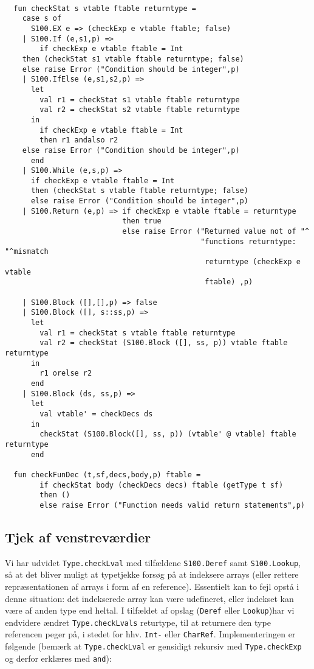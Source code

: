 \documentclass[10pt,a4paper,danish]{article}
\begin{document}
\begin{verbatim}

  fun checkStat s vtable ftable returntype =
    case s of
      S100.EX e => (checkExp e vtable ftable; false)
    | S100.If (e,s1,p) =>
        if checkExp e vtable ftable = Int
	then (checkStat s1 vtable ftable returntype; false)
	else raise Error ("Condition should be integer",p)
    | S100.IfElse (e,s1,s2,p) =>
      let
        val r1 = checkStat s1 vtable ftable returntype
        val r2 = checkStat s2 vtable ftable returntype
      in
        if checkExp e vtable ftable = Int
        then r1 andalso r2
	else raise Error ("Condition should be integer",p)
      end
    | S100.While (e,s,p) =>
      if checkExp e vtable ftable = Int
      then (checkStat s vtable ftable returntype; false)
      else raise Error ("Condition should be integer",p)
    | S100.Return (e,p) => if checkExp e vtable ftable = returntype
                           then true
                           else raise Error ("Returned value not of "^
                                             "functions returntype: "^mismatch
                                              returntype (checkExp e vtable 
                                              ftable) ,p)

    | S100.Block ([],[],p) => false
    | S100.Block ([], s::ss,p) =>
      let
        val r1 = checkStat s vtable ftable returntype
        val r2 = checkStat (S100.Block ([], ss, p)) vtable ftable returntype
      in
        r1 orelse r2
      end
    | S100.Block (ds, ss,p) =>
      let
        val vtable' = checkDecs ds
      in
        checkStat (S100.Block([], ss, p)) (vtable' @ vtable) ftable returntype
      end

  fun checkFunDec (t,sf,decs,body,p) ftable =
        if checkStat body (checkDecs decs) ftable (getType t sf)
        then ()
        else raise Error ("Function needs valid return statements",p)
\end{verbatim} 


\subsection{Tjek af venstreværdier}
Vi har udvidet \texttt{Type.checkLval} med tilfældene 
\texttt{S100.Deref} samt \texttt{S100.Lookup}, så at det
 bliver muligt at typetjekke forsøg på 
at indeksere arrays (eller rettere repræsentationen af arrays
i form af en reference). Essentielt kan to fejl opstå i denne 
situation: det indekserede array kan være udefineret, eller 
indekset kan være af anden type end heltal.
 I tilfældet af opslag (\texttt{Deref} eller 
\texttt{Lookup})har vi 
endvidere ændret \texttt{Type.checkLvals} returtype, til at returnere 
den type referencen peger på, i stedet for hhv. \texttt{Int-} eller
 \texttt{CharRef}. 
Implementeringen er følgende (bemærk at \texttt{Type.checkLval} er gensidigt
rekursiv med \texttt{Type.checkExp} og derfor erklæres med \texttt{and}): 
\end{document}
